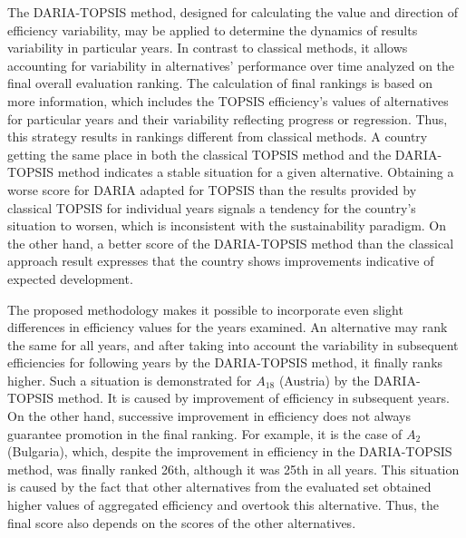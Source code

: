 \documentclass[final,5p,times,twocolumn,authoryear]{elsarticle}
\newcounter{example}[section]
\begin{document}
The DARIA-TOPSIS method, designed for calculating the value and direction of efficiency variability, may be applied to determine the dynamics of results variability in particular years. In contrast to classical methods, it allows accounting for variability in alternatives' performance over time analyzed on the final overall evaluation ranking. The calculation of final rankings is based on more information, which includes the TOPSIS efficiency's values of alternatives for particular years and their variability reflecting progress or regression. Thus, this strategy results in rankings different from classical methods.
A country getting the same place in both the classical TOPSIS method and the DARIA-TOPSIS method indicates a stable situation for a given alternative. Obtaining a worse score for DARIA adapted for TOPSIS than the results provided by classical TOPSIS for individual years signals a tendency for the country's situation to worsen, which is inconsistent with the sustainability paradigm. On the other hand, a better score of the DARIA-TOPSIS method than the classical approach result expresses that the country shows improvements indicative of expected development.

The proposed methodology makes it possible to incorporate even slight differences in efficiency values for the years examined. An alternative may rank the same for all years, and after taking into account the variability in subsequent efficiencies for following years by the DARIA-TOPSIS method, it finally ranks higher. Such a situation is demonstrated for $A_{18}$ (Austria) by the DARIA-TOPSIS method. It is caused by improvement of efficiency in subsequent years. On the other hand, successive improvement in efficiency does not always guarantee promotion in the final ranking. For example, it is the case of $A_{2}$ (Bulgaria), which, despite the improvement in efficiency in the DARIA-TOPSIS method, was finally ranked 26th, although it was 25th in all years. This situation is caused by the fact that other alternatives from the evaluated set obtained higher values of aggregated efficiency and overtook this alternative. Thus, the final score also depends on the scores of the other alternatives.
\end{document}
